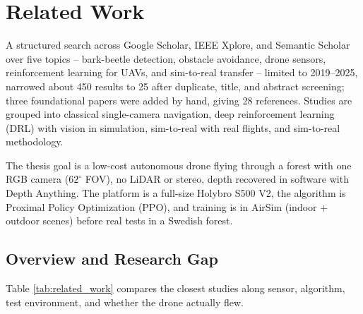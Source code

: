 \documentclass[../main.tex]{subfiles}
\begin{document}
\section{Related Work}
\justify

A structured search across Google Scholar, IEEE Xplore, and Semantic Scholar over five topics -- bark-beetle detection, obstacle avoidance, drone sensors, reinforcement learning for UAVs, and sim-to-real transfer -- limited to 2019--2025, narrowed about 450 results to 25 after duplicate, title, and abstract screening; three foundational papers \cite{Schulman2017,Pinto2017,Hrabar2012} were added by hand, giving 28 references. Studies are grouped into classical single-camera navigation, deep reinforcement learning (DRL) with vision in simulation, sim-to-real with real flights, and sim-to-real methodology.

The thesis goal is a low-cost autonomous drone flying through a forest with one RGB camera ($62^{\circ}$ FOV), no LiDAR or stereo, depth recovered in software with Depth Anything. The platform is a full-size Holybro S500 V2, the algorithm is Proximal Policy Optimization (PPO), and training is in AirSim (indoor + outdoor scenes) before real tests in a Swedish forest.

\subsection{Overview and Research Gap}

Table \ref{tab:related_work} compares the closest studies along sensor, algorithm, test environment, and whether the drone actually flew.
\end{document}
